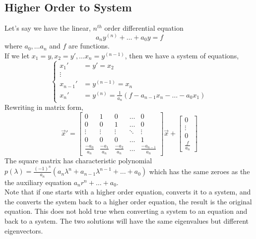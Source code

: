 \subsection{Higher Order to System}
\noindent
Let's say we have the linear, $n^{th}$ order differential equation
\begin{equation*}
	a_ny^{(n)} + \ldots + a_0y = f
\end{equation*}
where $a_0, \ldots a_n$ and $f$ are functions.\\

\noindent
If we let $x_1 = y, x_2 = y', \ldots x_n = y^{(n-1)}$, then we have a system of equations,
\begin{equation*}
	\begin{cases}
		x_1' &= y' = x_2 \\
		\vdots \\
		x_{n-1}' &= y^{(n-1)} = x_n \\
		x_n' &= y^{(n)} = \frac{1}{a_n}\left(f - a_{n-1}x_n - \ldots - a_0x_1\right)
	\end{cases}
\end{equation*}
Rewriting in matrix form,
\begin{equation*}
	\vec{x}' = \begin{bmatrix}
		0 & 1 & 0 & \ldots & 0 \\
		0 & 0 & 1 & \ldots & 0 \\
		\vdots & \vdots	& \vdots & \ddots & \vdots \\
		0 & 0 & 0 & \ldots & 1 \\
		\frac{-a_0}{a_n} & \frac{-a_1}{a_n} & \frac{-a_2}{a_n} & \ldots & \frac{-a_{n-1}}{a_n} 
	\end{bmatrix} \vec{x} + \begin{bmatrix}
		0 \\
		\vdots \\
		0 \\
		\frac{f}{a_n}
	\end{bmatrix}
\end{equation*}
The square matrix has characteristic polynomial $p(\lambda) = \frac{(-1)^{n}}{a_n}\left(a_n\lambda^n + a_{n-1}\lambda^{n-1} + \ldots + a_0\right)$ which has the same zeroes as the the auxiliary equation $a_nr^n + \ldots + a_0$.\\

\noindent
Note that if one starts with a higher order equation, converts it to a system, and the converts the system back to a higher order equation, the result is the original equation. This does not hold true when converting a system to an equation and back to a system. The two solutions will have the same eigenvalues but different eigenvectors.